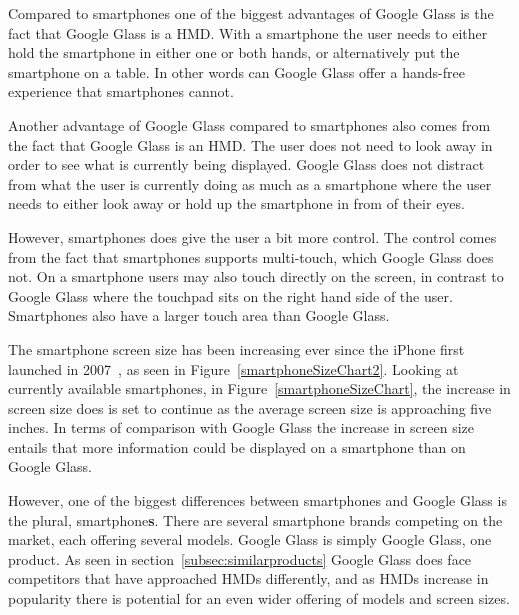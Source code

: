 Compared to smartphones one of the biggest advantages of Google Glass is the fact that Google Glass is a HMD. With a smartphone the user needs to either hold the smartphone in either one or both hands, or alternatively put the smartphone on a table. In other words can Google Glass offer a hands-free experience that smartphones cannot.

Another advantage of Google Glass compared to smartphones also comes from the fact that Google Glass is an HMD. The user does not need to look away in order to see what is currently being displayed. Google Glass does not distract from what the user is currently doing as much as a smartphone where the user needs to either look away or hold up the smartphone in from of their eyes.

However, smartphones does give the user a bit more control. The control comes from the fact that smartphones supports multi-touch, which Google Glass does not. On a smartphone users may also touch directly on the screen, in contrast to Google Glass where the touchpad sits on the right hand side of the user. Smartphones also have a larger touch area than Google Glass.

The smartphone screen size has been increasing ever since the iPhone first launched in 2007~\cite{iphoneWiki}, as seen in Figure~\ref{smartphoneSizeChart2}. Looking at currently available smartphones, in Figure~\ref{smartphoneSizeChart}, the increase in screen size does is set to continue as the average screen size is approaching five inches. In terms of comparison with Google Glass the increase in screen size entails that more information could be displayed on a smartphone than on Google Glass.

However, one of the biggest differences between smartphones and Google Glass is the plural, smartphone\textbf{s}. There are several smartphone brands competing on the market, each offering several models. Google Glass is simply Google Glass, one product. As seen in section~\ref{subsec:similarproducts} Google Glass does face competitors that have approached HMDs differently, and as HMDs increase in popularity there is potential for an even wider offering of models and screen sizes.

